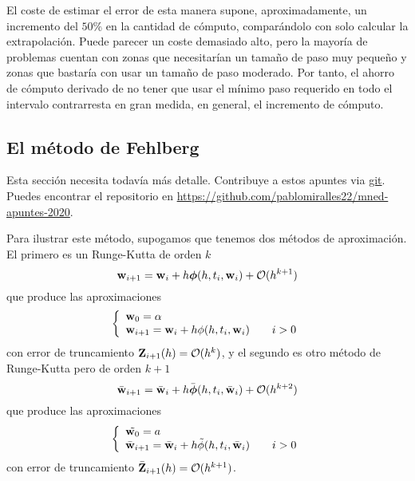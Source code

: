 \begin{remark}
    El coste de estimar el error de esta manera supone, aproximadamente,
    un incremento del $50\%$ en la cantidad de cómputo,
    comparándolo con solo calcular la extrapolación.
    Puede parecer un coste demasiado alto,
    pero la mayoría de problemas cuentan con
    zonas que necesitarían un tamaño de paso muy pequeño
    y zonas que bastaría con usar un tamaño de paso moderado.
    Por tanto, el ahorro de cómputo derivado de no tener que
    usar el mínimo paso requerido en todo el intervalo
    contrarresta en gran medida, en general,
    el incremento de cómputo.
\end{remark}  

\subsection{El método de Fehlberg}

\begin{editorial}
    Esta sección necesita todavía más detalle.
    Contribuye a estos apuntes via \href{https://git-scm.com/}{git}.
    Puedes encontrar el repositorio en
    \url{https://github.com/pablomiralles22/mned-apuntes-2020}.
\end{editorial}

Para ilustrar este método,
supogamos que tenemos dos métodos de aproximación.
El primero es un Runge-Kutta de orden $k$
\begin{equation*}
    \vb{w}{}_{i+1} = \vb{w}{}_i + h\vb*{\phi}{}(h, t_i, \vb{w}{}_i) + \vb{\mathcal{O}}{}(h^{k+1})
\end{equation*}
que produce las aproximaciones
\begin{equation*}
    \left\{
    \begin{array}{lll}
    \vb{w}{}_0 = \alpha & & \\
    \vb{w}{}_{i+1} = \vb{w}{}_i + h\phi(h, t_i, \vb{w}{}_i) & & i >0
    \end{array}
    \right.
\end{equation*}
con error de truncamiento $\vb{Z}{}_{i+1}(h) = \vb{\mathcal{O}}{}(h^k)$,
y el segundo es otro método de Runge-Kutta pero de orden $k+1$
\begin{equation*}
    \bar{\vb{w}{}}_{i+1} = \bar{\vb{w}{}}_i + h\bar{\vb*{\phi}{}}(h, t_i, \bar{\vb{w}{}}_i) + \vb{\mathcal{O}}{}(h^{k+2})
\end{equation*}
que produce las aproximaciones
\begin{equation*}
    \left\{
    \begin{array}{lll}
    \tilde{\vb{w}{}_0} = a & & \\
    \bar{\vb{w}{}}_{i+1} = \bar{\vb{w}{}}_i + h\tilde{\phi}(h, t_i, \bar{\vb{w}{}}_i) & & i >0
    \end{array}
    \right.
\end{equation*}
con error de truncamiento $\bar{\vb{Z}{}}_{i+1}(h) = \vb{\mathcal{O}}{}(h^{k+1})$.

